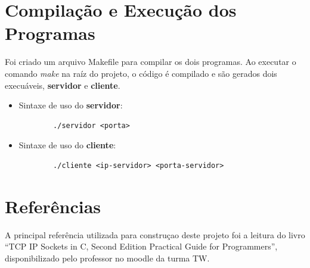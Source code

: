 \documentclass[12pt]{article}
\begin{document}
\section{Compilação e Execução dos Programas}

Foi criado um arquivo Makefile para compilar os dois programas. Ao executar o comando \emph{make} na raíz do projeto, o código é compilado e são gerados dois execuáveis, \textbf{servidor} e \textbf{cliente}. \par

\begin{itemize}
    \item Sintaxe de uso do \textbf{servidor}:
    \begin{verbatim}
        ./servidor <porta>
    \end{verbatim}
    \item  Sintaxe de uso do \textbf{cliente}:
    \begin{verbatim}
        ./cliente <ip-servidor> <porta-servidor>
    \end{verbatim}
\end{itemize}

\newpage

\section{Referências}

A principal referência utilizada para construçao deste projeto foi a leitura do livro ``TCP IP Sockets in C, Second Edition Practical Guide for Programmers'', disponibilizado pelo professor no moodle da turma TW. \par
\end{document}
